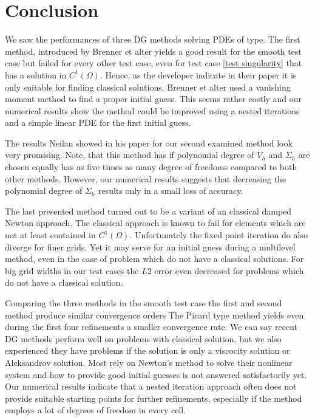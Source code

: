 \section{Conclusion}

We saw the performances of three DG methods solving PDEs of \MA type.
The first method, introduced by Brenner et alter yields a good result for the smooth test case but failed for every other test case, even for test case \ref{test singularity} that has a solution in $C^1(\Omega)$. Hence, as the developer indicate in their paper it is only suitable for finding classical solutions.
Brenner et alter used a vanishing moment method to find a proper initial guess. This seems rather costly and our numerical results show the method could be improved using a nested iterations and a simple linear PDE for the first initial guess.

The results Neilan showed in his paper for our second examined method look very promising.
Note, that this method has if polynomial degree of $V_h$ and $\Sigma_h$ are chosen equally has as five times as many degree of freedoms compared to both other methods. However, our numerical results suggests that decreasing the polynomial degree of $\Sigma_h$ results only in a small loss of accuracy.

The last presented method turned out to be a variant of an classical damped Newton approach. 
The classical approach is known to fail for elements which are not at least contained in $C^1(\Omega)$. Unfortunately the fixed point iteration do also diverge for finer grids. Yet it may serve for an initial guess during a multilevel method, even in the case of problem which do not have a classical solutions. For big grid widths in our test cases the $L2$ error even decreased for problems which do not have a classical solution.

Comparing the three methods in the smooth test case the first and second method produce similar convergence orders %
The Picard type method yields even during the first four refinements a smaller convergence rate. We can say recent DG methods perform well on problems with classical solution, but we also experienced they have problems if the \MA solution is only a viscocity solution or Aleksandrov solution. Most rely on Newton's method to solve their nonlinear system and how to provide good initial guesses is not answered satisfactorily yet.
Our numerical results indicate that a nested iteration approach often does not provide suitable starting points for further refinements, especially if the method employs a lot of degrees of freedom in every cell.

